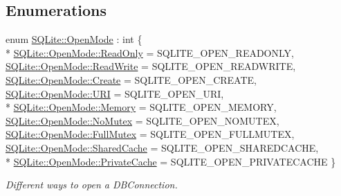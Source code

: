 \subsection*{Enumerations}
\begin{DoxyCompactItemize}
\item 
enum \hyperlink{a00038_a0d8721ab00cfcf85ba4eed715ccfecec}{S\-Q\-Lite\-::\-Open\-Mode} \-: int \{ \\*
\hyperlink{a00038_a0d8721ab00cfcf85ba4eed715ccfececa131fb182a881796e7606ed6da27f1197}{S\-Q\-Lite\-::\-Open\-Mode\-::\-Read\-Only} = S\-Q\-L\-I\-T\-E\-\_\-\-O\-P\-E\-N\-\_\-\-R\-E\-A\-D\-O\-N\-L\-Y, 
\hyperlink{a00038_a0d8721ab00cfcf85ba4eed715ccfececa70a2a84088d405a2e3f1e3accaa16723}{S\-Q\-Lite\-::\-Open\-Mode\-::\-Read\-Write} = S\-Q\-L\-I\-T\-E\-\_\-\-O\-P\-E\-N\-\_\-\-R\-E\-A\-D\-W\-R\-I\-T\-E, 
\hyperlink{a00038_a0d8721ab00cfcf85ba4eed715ccfececa686e697538050e4664636337cc3b834f}{S\-Q\-Lite\-::\-Open\-Mode\-::\-Create} = S\-Q\-L\-I\-T\-E\-\_\-\-O\-P\-E\-N\-\_\-\-C\-R\-E\-A\-T\-E, 
\hyperlink{a00038_a0d8721ab00cfcf85ba4eed715ccfececa8447306210a0972ac94b7d774799df1a}{S\-Q\-Lite\-::\-Open\-Mode\-::\-U\-R\-I} = S\-Q\-L\-I\-T\-E\-\_\-\-O\-P\-E\-N\-\_\-\-U\-R\-I, 
\\*
\hyperlink{a00038_a0d8721ab00cfcf85ba4eed715ccfececa4789f23283b3a61f858b641a1bef19a3}{S\-Q\-Lite\-::\-Open\-Mode\-::\-Memory} = S\-Q\-L\-I\-T\-E\-\_\-\-O\-P\-E\-N\-\_\-\-M\-E\-M\-O\-R\-Y, 
\hyperlink{a00038_a0d8721ab00cfcf85ba4eed715ccfececaed897a216de36c7c934c4baa02b4fea7}{S\-Q\-Lite\-::\-Open\-Mode\-::\-No\-Mutex} = S\-Q\-L\-I\-T\-E\-\_\-\-O\-P\-E\-N\-\_\-\-N\-O\-M\-U\-T\-E\-X, 
\hyperlink{a00038_a0d8721ab00cfcf85ba4eed715ccfececa3322fce9aa781563c086ffd3c13da8b4}{S\-Q\-Lite\-::\-Open\-Mode\-::\-Full\-Mutex} = S\-Q\-L\-I\-T\-E\-\_\-\-O\-P\-E\-N\-\_\-\-F\-U\-L\-L\-M\-U\-T\-E\-X, 
\hyperlink{a00038_a0d8721ab00cfcf85ba4eed715ccfececadd8141c2dbba4f369c304f748a6badf6}{S\-Q\-Lite\-::\-Open\-Mode\-::\-Shared\-Cache} = S\-Q\-L\-I\-T\-E\-\_\-\-O\-P\-E\-N\-\_\-\-S\-H\-A\-R\-E\-D\-C\-A\-C\-H\-E, 
\\*
\hyperlink{a00038_a0d8721ab00cfcf85ba4eed715ccfececa54f0a906e1d7cbe43867c40793c22c91}{S\-Q\-Lite\-::\-Open\-Mode\-::\-Private\-Cache} = S\-Q\-L\-I\-T\-E\-\_\-\-O\-P\-E\-N\-\_\-\-P\-R\-I\-V\-A\-T\-E\-C\-A\-C\-H\-E
 \}
\begin{DoxyCompactList}\small\item\em Different ways to open a D\-B\-Connection. \end{DoxyCompactList}\end{DoxyCompactItemize}
